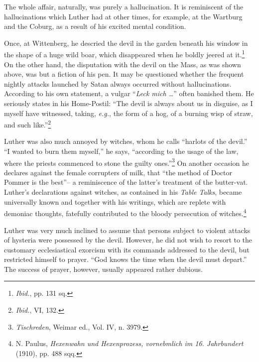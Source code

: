 The whole affair, naturally, was purely a hallucination. It is
reminiscent of the hallucinations which Luther had at other times, for
example, at the Wartburg and the Coburg, as a result of his excited
mental condition.

Once, at Wittenberg, he descried the devil in the garden beneath his window in
the shape of a huge wild boar, which disappeared when he boldly jeered at
it.\footnote{\textit{Ibid.}, pp. 131 sq.} On the other hand, the disputation
with the devil on the Mass, as was shown above, was but a fiction of his pen.
It may be questioned whether the frequent nightly attacks launched by Satan
always occurred without hallucinations. According to his own statement, a
vulgar “\textit{Leck mich \dots}” often banished them. He seriously states in
his Home-Postil: “The devil is always about us in disguise, as I myself have
witnessed, taking, \textit{e.g.}, the form of a hog, of a burning wisp of
straw, and such like.”\footnote{\textit{Ibid.}, VI, 132.}

Luther was also much annoyed by witches, whom he calls “harlots of the devil.”
“I wanted to burn them myself,” he says, “according to the usage of the law,
where the priests commenced to stone the guilty
ones.”\footnote{\textit{Tischreden}, Weimar ed., Vol. IV, n. 3979.} On another
occasion he declares against the female corrupters of milk, that “the method of
Doctor Pommer is the best”-- a reminiscence of the latter’s treatment of the
butter-vat. Luther’s declarations against witches, as contained in his
\textit{Table Talks}, became universally known and together with his writings,
which are replete with demoniac thoughts, fatefully contributed to the bloody
persecution of witches.\footnote{N. Paulus, \textit{Hexenwahn und Hexenprozess,
vornebmlich im 16. Jahrbundert} (1910), pp. 488 sqq.}

Luther was very much inclined to assume that persons subject to
violent attacks of hysteria were possessed by the devil. However, he
did not wish to resort to the customary ecclesiastical exorcism with
its commands addressed to the devil, but restricted himself to prayer.
“God knows the time when the devil must depart.” The success of
prayer, however, usually appeared rather dubious.


